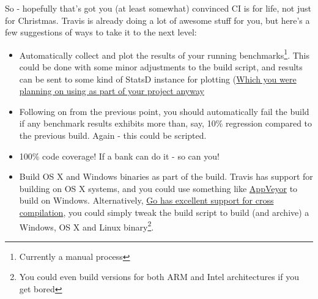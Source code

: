 So - hopefully that's got you (at least somewhat) convinced CI is for life, not
just for Christmas. Travis is already doing a lot of awesome stuff for you, but
here's a few suggestions of ways to take it to the next level:

\begin{itemize}
  \item Automatically collect and plot the results of your running benchmarks\footnote{Currently a manual process}.
  This could be done with some minor adjustments to the build script, and results
  can be sent to some kind of StatsD instance for plotting
  (\href{https://github.com/FireEater64/grafana-statsd-influxdb-docker}{Which you
  were planning on using as part of your project anyway}
  \item Following on from the previous point, you should automatically fail the
  build if any benchmark results exhibits more than, say, 10\% regression compared
  to the previous build. Again - this could be scripted.
  \item 100\% code coverage! If a bank can do it - so can you!
  \item Build OS X and Windows binaries as part of the build. Travis has support
  for building on OS X systems, and you could use something like
  \href{http://www.appveyor.com/}{AppVeyor} to build on Windows. Alternatively,
  \href{http://dave.cheney.net/2015/08/22/cross-compilation-with-go-1-5}{Go
  has excellent support for cross compilation}, you could simply tweak the build
  script to build (and archive) a Windows, OS X and Linux
  binary\footnote{You could even build versions for both ARM and Intel architectures if you get bored}.
\end{itemize}
